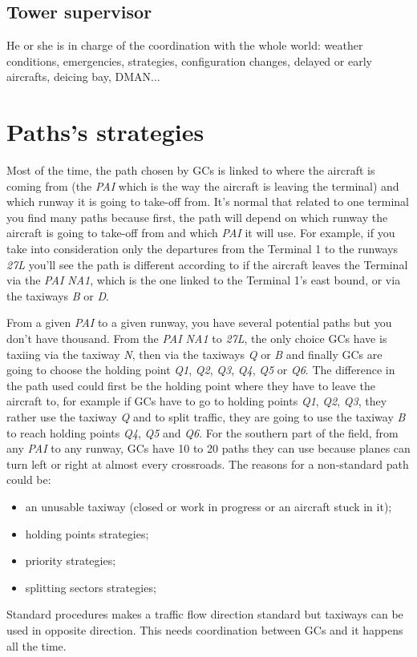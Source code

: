\documentclass{article}
\begin{document}
\subsection{Tower supervisor}
He or she is in charge of the coordination with the whole world: weather conditions, emergencies, strategies, configuration changes, delayed or early aircrafts, deicing bay, DMAN...



\section{Paths's strategies}
Most of the time, the path chosen by GCs is linked to where the aircraft is coming from (the \textit{PAI} which is the way the aircraft is leaving the terminal) and which runway it is going to take-off from.
It's normal that related to one terminal you find many paths because first, the path will depend on which runway the aircraft is going to take-off from and which \textit{PAI} it will use. For example, if you take into consideration only the departures from the Terminal 1 to the runways \textit{27L} you'll see the path is different according to if the aircraft leaves the Terminal via the \textit{PAI NA1}, which is the one linked to the Terminal 1's east bound, or via the taxiways \textit{B} or \textit{D}.

From a given \textit{PAI} to a given runway, you have several potential paths but you don't have thousand. From the \textit{PAI NA1} to \textit{27L}, the only choice GCs have is taxiing via the taxiway \textit{N}, then via the taxiways \textit{Q} or \textit{B} and finally GCs are going to choose the holding point \textit{Q1}, \textit{Q2}, \textit{Q3}, \textit{Q4}, \textit{Q5} or \textit{Q6}. The difference in the path used could first be the holding point where they have to leave the aircraft to, for example if GCs have to go to holding points \textit{Q1}, \textit{Q2}, \textit{Q3}, they rather use the taxiway \textit{Q} and to split traffic, they are going to use the taxiway \textit{B} to reach holding points \textit{Q4}, \textit{Q5} and \textit{Q6}. For the southern part of the field, from any \textit{PAI} to any runway, GCs have 10 to 20 paths they can use because planes can turn left or right at almost every crossroads. The reasons for a non-standard path could be:
\begin{itemize}
    \item an unusable taxiway (closed or work in progress or an aircraft stuck in it);
    \item holding points strategies;
    \item priority strategies;
    \item splitting sectors strategies;
\end{itemize}
Standard procedures makes a traffic flow direction standard but taxiways can be used in opposite direction. This needs coordination between GCs and it happens all the time.
\end{document}
